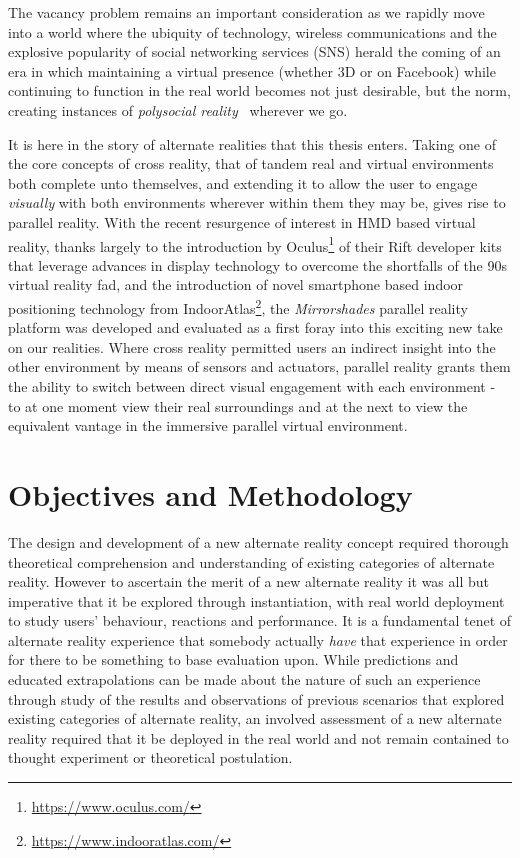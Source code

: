 The vacancy problem remains an important consideration as we rapidly move into a world where the ubiquity of technology, wireless communications and the explosive popularity of social networking services (SNS) herald the coming of an era in which maintaining a virtual presence (whether 3D or on Facebook) while continuing to function in the real world becomes not just desirable, but the norm, creating instances of \textit{polysocial reality}~\cite{Applin2012} wherever we go.

It is here in the story of alternate realities that this thesis enters. Taking one of the core concepts of cross reality, that of tandem real and virtual environments both complete unto themselves, and extending it to allow the user to engage \textit{visually} with both environments wherever within them they may be, gives rise to parallel reality. With the recent resurgence of interest in HMD based virtual reality, thanks largely to the introduction by Oculus\footnote{\url{https://www.oculus.com/}} of their Rift developer kits that leverage advances in display technology to overcome the shortfalls of the 90s virtual reality fad, and the introduction of novel smartphone based indoor positioning technology from IndoorAtlas\footnote{\url{https://www.indooratlas.com/}}, the \textit{Mirrorshades} parallel reality platform was developed and evaluated as a first foray into this exciting new take on our realities. Where cross reality permitted users an indirect insight into the other environment by means of sensors and actuators, parallel reality grants them the ability to switch between direct visual engagement with each environment - to at one moment view their real surroundings and at the next to view the equivalent vantage in the immersive parallel virtual environment.


\section{Objectives and Methodology}
\label{objectivesandmethodology}
The design and development of a new alternate reality concept required thorough theoretical comprehension and understanding of existing categories of alternate reality. However to ascertain the merit of a new alternate reality it was all but imperative that it be explored through instantiation, with real world deployment to study users' behaviour, reactions and performance. It is a fundamental tenet of alternate reality experience that somebody actually \textit{have} that experience in order for there to be something to base evaluation upon. While predictions and educated extrapolations can be made about the nature of such an experience through study of the results and observations of previous scenarios that explored existing categories of alternate reality, an involved assessment of a new alternate reality required that it be deployed in the real world and not remain contained to thought experiment or theoretical postulation.

